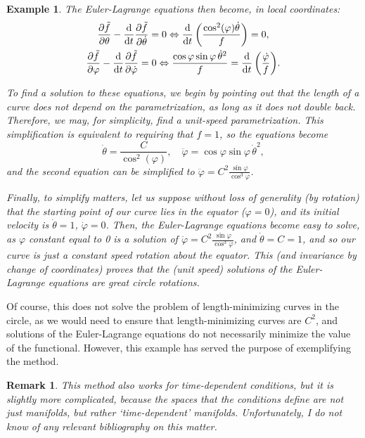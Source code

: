 \documentclass{article}
\theoremstyle{plain}
\theoremstyle{plain}
\newtheorem{remark}{Remark}
\newtheorem{example}{Example}
\theoremstyle{nonumberplain}
\theoremstyle{empty}
\begin{document}
\begin{example}
The Euler-Lagrange equations then become, in local coordinates:
\begin{gather*}
\diffp{\tilde f} \theta - \diff*{\diffp{\tilde f}{\dot \theta}}t = 0 \Leftrightarrow \diff*{\left( \frac{\cos^2(\varphi) \dot \theta}{f} \right)}t = 0,\\
\diffp{\tilde f} \varphi - \diff*{\diffp{\tilde f}{\dot \varphi}}t = 0
\Leftrightarrow
\frac{\cos\varphi \sin\varphi \,\dot \theta^2}{f} = \diff*{\left( \frac{\dot \varphi}{f} \right)}t.
\end{gather*}

To find a solution to these equations, we begin by pointing out that the length of a curve does not depend on the parametrization, as long as it does not double back. Therefore, we may, for simplicity, find a unit-speed parametrization. This simplification is equivalent to requiring that $f = 1$, so the equations become
\[\dot \theta = \frac C {\cos^2(\varphi)}, \quad \ddot \varphi = \cos\varphi \sin\varphi \, \dot \theta^2,\]
and the second equation can be simplified to $\ddot \varphi = C^2 \frac{\sin\varphi}{\cos^3 \varphi}$.

Finally, to simplify matters, let us suppose without loss of generality (by rotation) that the starting point of our curve lies in the equator ($\varphi = 0$), and its initial velocity is $\dot\theta = 1$, $\dot \varphi = 0$. Then, the Euler-Lagrange equations become easy to solve, as $\varphi$ constant equal to 0 is a solution of $\ddot \varphi = C^2 \frac{\sin\varphi}{\cos^3 \varphi}$, and $\dot \theta = C = 1$, and so our curve is just a constant speed rotation about the equator. This (and invariance by change of coordinates) proves that the (unit speed) solutions of the Euler-Lagrange equations are great circle rotations.
\end{example}

Of course, this does not solve the problem of length-minimizing curves in the circle, as we would need to ensure that length-minimizing curves are $C^2$, and solutions of the Euler-Lagrange equations do not necessarily minimize the value of the functional. However, this example has served the purpose of exemplifying the method.

\begin{remark}
This method also works for time-dependent conditions, but it is slightly more complicated, because the spaces that the conditions define are not just manifolds, but rather `time-dependent' manifolds. Unfortunately, I do not know of any relevant bibliography on this matter.
\end{remark}
\end{document}
